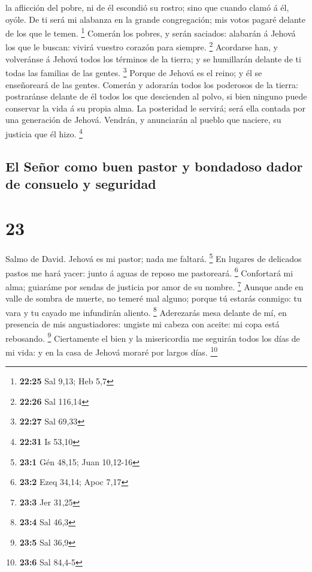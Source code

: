la aflicción del pobre, ni de él escondió su rostro; sino que cuando
clamó á él, oyóle.  De ti será mi alabanza en la grande
congregación; mis votos pagaré delante de los que le temen. \footnote{\textbf{22:25}
  Sal 9,13; Heb 5,7}  Comerán los pobres, y serán saciados:
alabarán á Jehová los que le buscan: vivirá vuestro corazón para
siempre. \footnote{\textbf{22:26} Sal 116,14}  Acordarse
han, y volveránse á Jehová todos los términos de la tierra; y se
humillarán delante de ti todas las familias de las gentes. \footnote{\textbf{22:27}
  Sal 69,33}  Porque de Jehová es el reino; y él se
enseñoreará de las gentes.  Comerán y adorarán todos los
poderosos de la tierra: postraránse delante de él todos los que
descienden al polvo, si bien ninguno puede conservar la vida á su propia
alma.  La posteridad le servirá; será ella contada por una
generación de Jehová.  Vendrán, y anunciarán al pueblo que
naciere, su justicia que él hizo. \footnote{\textbf{22:31} Is 53,10}

\hypertarget{el-seuxf1or-como-buen-pastor-y-bondadoso-dador-de-consuelo-y-seguridad}{%
\subsection{El Señor como buen pastor y bondadoso dador de consuelo y
seguridad}\label{el-seuxf1or-como-buen-pastor-y-bondadoso-dador-de-consuelo-y-seguridad}}

\hypertarget{section-22}{%
\section{23}\label{section-22}}

 Salmo de David. Jehová es mi pastor; nada me faltará.
\footnote{\textbf{23:1} Gén 48,15; Juan 10,12-16}  En
lugares de delicados pastos me hará yacer: junto á aguas de reposo me
pastoreará. \footnote{\textbf{23:2} Ezeq 34,14; Apoc 7,17} 
Confortará mi alma; guiaráme por sendas de justicia por amor de su
nombre. \footnote{\textbf{23:3} Jer 31,25}  Aunque ande en
valle de sombra de muerte, no temeré mal alguno; porque tú estarás
conmigo: tu vara y tu cayado me infundirán aliento. \footnote{\textbf{23:4}
  Sal 46,3}  Aderezarás mesa delante de mí, en presencia de
mis angustiadores: ungiste mi cabeza con aceite: mi copa está rebosando.
\footnote{\textbf{23:5} Sal 36,9}  Ciertamente el bien y la
misericordia me seguirán todos los días de mi vida: y en la casa de
Jehová moraré por largos días. \footnote{\textbf{23:6} Sal 84,4-5}

